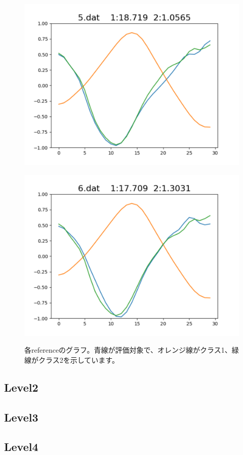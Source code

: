 \begin{figure}[h]
\begin{minipage}[b]{0.32\linewidth}
  \includegraphics[keepaspectratio, scale=0.3]
  {./pic/level1/5_dat.pdf}
  \label{5dat}
 \end{minipage}
  \begin{minipage}[b]{0.32\linewidth}
  \centering
  \includegraphics[keepaspectratio, scale=0.3]
  {./pic/level1/6_dat.pdf}
  \label{6dat}
 \end{minipage}
 \caption{各referenceのグラフ。青線が評価対象で、オレンジ線がクラス1、緑線がクラス2を示しています。}\label{reg_poly}
\end{figure}

\subsection*{Level2}

\subsection*{Level3}

\subsection*{Level4}
	
	
	
	

